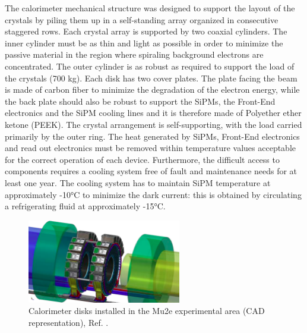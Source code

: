 The calorimeter mechanical structure was designed to support the layout of the crystals 
by piling them up in a self-standing array organized in consecutive staggered rows. 
Each crystal array is supported by two coaxial cylinders. The inner cylinder must be 
as thin and light as possible in order to minimize the passive material in the 
region where spiraling background electrons are concentrated. The outer cylinder 
is as robust as required to support the load of the crystals (700 kg). Each disk 
has two cover plates. The plate facing the beam is made of carbon fiber to minimize 
the degradation of the electron energy, while the back plate should also be robust 
to support the SiPMs, the Front-End electronics and the SiPM cooling lines and it 
is therefore made of Polyether ether ketone (PEEK). The crystal arrangement is 
self-supporting, with the load carried primarily by the outer ring. 
The heat generated by SiPMs, Front-End electronics and read out electronics 
must be removed within temperature values acceptable for the correct operation 
of each device. Furthermore, the difficult access to components requires a 
cooling system free of fault and maintenance needs for at least one year. 
The cooling system has to maintain SiPM temperature at approximately -10°C to 
minimize the dark current: this is obtained by circulating a refrigerating fluid at approximately  -15°C.


\begin{figure}[!h]
    \centering
    \includegraphics[width =0.6\textwidth]{figures/png/Screenshot_20240322_122050.png}
    \caption[CAD representation of the calorimeter disks.]{Calorimeter disks installed in the Mu2e experimental area (CAD representation), Ref. \cite{em7}.}
    \label{fig:calo1}
\end{figure}



